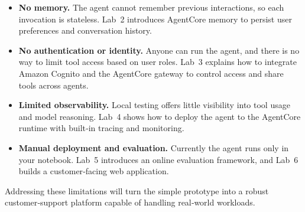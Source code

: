 \begin{itemize}
  \item \textbf{No memory.}  The agent cannot remember previous
        interactions, so each invocation is stateless.  Lab 2 introduces
        AgentCore memory to persist user preferences and conversation
        history.
  \item \textbf{No authentication or identity.}  Anyone can run the agent,
        and there is no way to limit tool access based on user roles.
        Lab 3 explains how to integrate Amazon Cognito and the
        AgentCore gateway to control access and share tools across agents.
  \item \textbf{Limited observability.}  Local testing offers little
        visibility into tool usage and model reasoning.  Lab 4 shows how to
        deploy the agent to the AgentCore runtime with built‑in tracing
        and monitoring.
  \item \textbf{Manual deployment and evaluation.}  Currently the agent
        runs only in your notebook.  Lab 5 introduces an online
        evaluation framework, and Lab 6 builds a customer‑facing web
        application.
\end{itemize}

Addressing these limitations will turn the simple prototype into a robust
customer‑support platform capable of handling real‑world workloads.


